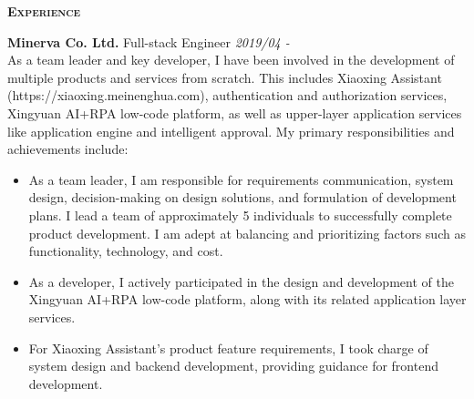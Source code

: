 \documentclass[a4paper]{article}
\newenvironment{changemargin}[2]{%
  \begin{list}{}{%
    \setlength{\topsep}{0pt}%
    \setlength{\leftmargin}{#1}%
    \setlength{\rightmargin}{#2}%
    \setlength{\listparindent}{\parindent}%
    \setlength{\itemindent}{\parindent}%
    \setlength{\parsep}{\parskip}%
  }%
  \item[]}{\end{list}
}
\newcommand{\lineover}{
	\begin{changemargin}{-0.05in}{-0.05in}
		\vspace*{-8pt}
		\hrulefill \\
		\vspace*{-2pt}
	\end{changemargin}
}
\newcommand{\header}[1]{
	\begin{changemargin}{-0.5in}{-0.5in}
		\scshape{\textbf{#1}}\\
	\end{changemargin}
}
\newenvironment{body} {
	\vspace*{-16pt}
	\begin{changemargin}{-0.5in}{-0.5in}
  }
	{\end{changemargin}
}
\begin{document}
\header{Experience}
\begin{body}
	\vspace{14pt}
	\textbf{Minerva Co. Ltd.} \hfill Full-stack Engineer \emph{2019/04 - } \\
	\smallskip
	As a team leader and key developer, I have been involved in the development of multiple products and services from scratch. This includes Xiaoxing Assistant (https://xiaoxing.meinenghua.com), authentication and authorization services, Xingyuan AI+RPA low-code platform, as well as upper-layer application services like application engine and intelligent approval. My primary responsibilities and achievements include:\\
	\begin{itemize} \itemsep -0pt  %
		\item As a team leader, I am responsible for requirements communication, system design, decision-making on design solutions, and formulation of development plans. I lead a team of approximately 5 individuals to successfully complete product development. I am adept at balancing and prioritizing factors such as functionality, technology, and cost.\\
	\end{itemize}
	\vspace*{-8pt}
	\begin{itemize} \itemsep -0pt  %
		\item As a developer, I actively participated in the design and development of the Xingyuan AI+RPA low-code platform, along with its related application layer services.\\
	\end{itemize}
	\vspace*{-8pt}
	\begin{itemize} \itemsep -0pt  %
		\item For Xiaoxing Assistant's product feature requirements, I took charge of system design and backend development, providing guidance for frontend development.\\
	\end{itemize}

\end{body}
\end{document}
